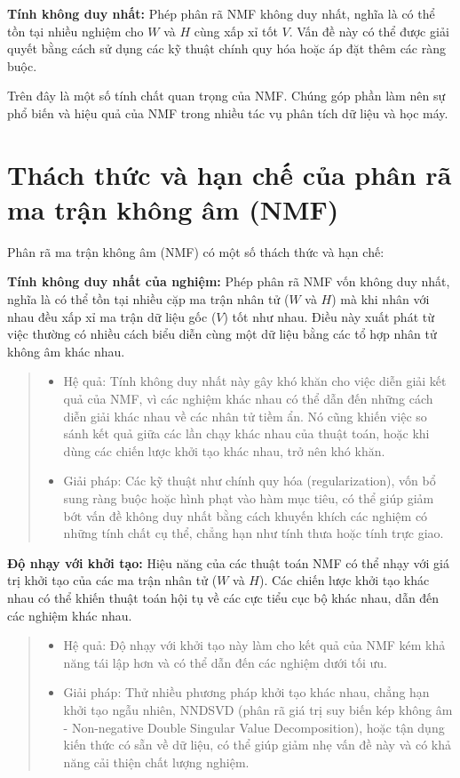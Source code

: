 \textbf{Tính không duy nhất:} Phép phân rã NMF không duy nhất, nghĩa là có thể tồn tại nhiều nghiệm cho \(W\) và \(H\) cùng xấp xỉ tốt \(V\). Vấn đề này có thể được giải quyết bằng cách sử dụng các kỹ thuật chính quy hóa hoặc áp đặt thêm các ràng buộc.

Trên đây là một số tính chất quan trọng của NMF. Chúng góp phần làm nên sự phổ biến và hiệu quả của NMF trong nhiều tác vụ phân tích dữ liệu và học máy.

\section{Thách thức và hạn chế của phân rã ma trận không âm (NMF)}

Phân rã ma trận không âm (NMF) có một số thách thức và hạn chế:

\textbf{Tính không duy nhất của nghiệm:} Phép phân rã NMF vốn không duy nhất, nghĩa là có thể tồn tại nhiều cặp ma trận nhân tử (\(W\) và \(H\)) mà khi nhân với nhau đều xấp xỉ ma trận dữ liệu gốc (\(V\)) tốt như nhau. Điều này xuất phát từ việc thường có nhiều cách biểu diễn cùng một dữ liệu bằng các tổ hợp nhân tử không âm khác nhau.

\begin{quote}
\begin{itemize}
\item
  Hệ quả: Tính không duy nhất này gây khó khăn cho việc diễn giải kết quả của NMF, vì các nghiệm khác nhau có thể dẫn đến những cách diễn giải khác nhau về các nhân tử tiềm ẩn. Nó cũng khiến việc so sánh kết quả giữa các lần chạy khác nhau của thuật toán, hoặc khi dùng các chiến lược khởi tạo khác nhau, trở nên khó khăn.
\item
  Giải pháp: Các kỹ thuật như chính quy hóa (regularization), vốn bổ sung ràng buộc hoặc hình phạt vào hàm mục tiêu, có thể giúp giảm bớt vấn đề không duy nhất bằng cách khuyến khích các nghiệm có những tính chất cụ thể, chẳng hạn như tính thưa hoặc tính trực giao.
\end{itemize}
\end{quote}

\textbf{Độ nhạy với khởi tạo:} Hiệu năng của các thuật toán NMF có thể nhạy với giá trị khởi tạo của các ma trận nhân tử (\(W\) và \(H\)). Các chiến lược khởi tạo khác nhau có thể khiến thuật toán hội tụ về các cực tiểu cục bộ khác nhau, dẫn đến các nghiệm khác nhau.

\begin{quote}
\begin{itemize}
\item
  Hệ quả: Độ nhạy với khởi tạo này làm cho kết quả của NMF kém khả năng tái lập hơn và có thể dẫn đến các nghiệm dưới tối ưu.
\item
  Giải pháp: Thử nhiều phương pháp khởi tạo khác nhau, chẳng hạn khởi tạo ngẫu nhiên, NNDSVD (phân rã giá trị suy biến kép không âm - Non-negative Double Singular Value Decomposition), hoặc tận dụng kiến thức có sẵn về dữ liệu, có thể giúp giảm nhẹ vấn đề này và có khả năng cải thiện chất lượng nghiệm.
\end{itemize}
\end{quote}

